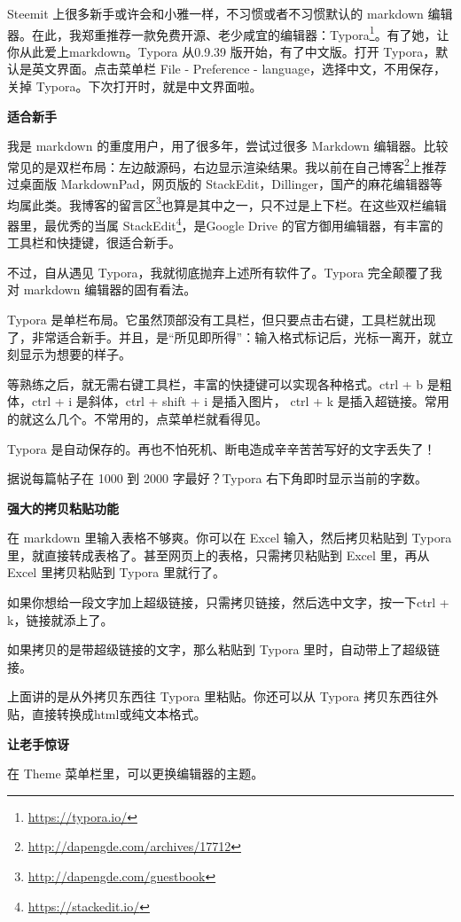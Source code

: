 \documentclass[]{ctexbook}
\renewcommand{\href}[2]{#2\footnote{\url{#1}}}
\begin{document}
Steemit 上很多新手或许会和小雅一样，不习惯或者不习惯默认的 markdown 编辑器。在此，我郑重推荐一款免费开源、老少咸宜的编辑器：\href{https://typora.io/}{Typora}。有了她，让你从此爱上markdown。Typora 从0.9.39 版开始，有了中文版。打开 Typora，默认是英文界面。点击菜单栏 File - Preference - language，选择中文，不用保存，关掉 Typora。下次打开时，就是中文界面啦。

\textbf{适合新手}

我是 markdown 的重度用户，用了很多年，尝试过很多 Markdown 编辑器。比较常见的是双栏布局：左边敲源码，右边显示渲染结果。我以前在\href{http://dapengde.com/archives/17712}{自己博客}上推荐过桌面版 MarkdownPad，网页版的 StackEdit，Dillinger，国产的麻花编辑器等均属此类。我\href{http://dapengde.com/guestbook}{博客的留言区}也算是其中之一，只不过是上下栏。在这些双栏编辑器里，最优秀的当属 \href{https://stackedit.io/}{StackEdit}，是Google Drive 的官方御用编辑器，有丰富的工具栏和快捷键，很适合新手。

不过，自从遇见 Typora，我就彻底抛弃上述所有软件了。Typora 完全颠覆了我对 markdown 编辑器的固有看法。

Typora 是单栏布局。它虽然顶部没有工具栏，但只要点击右键，工具栏就出现了，非常适合新手。并且，是``所见即所得''：输入格式标记后，光标一离开，就立刻显示为想要的样子。

等熟练之后，就无需右键工具栏，丰富的快捷键可以实现各种格式。ctrl + b 是粗体，ctrl + i 是斜体，ctrl + shift + i 是插入图片， ctrl + k 是插入超链接。常用的就这么几个。不常用的，点菜单栏就看得见。

Typora 是自动保存的。再也不怕死机、断电造成辛辛苦苦写好的文字丢失了！

据说每篇帖子在 1000 到 2000 字最好？Typora 右下角即时显示当前的字数。

\textbf{强大的拷贝粘贴功能}

在 markdown 里输入表格不够爽。你可以在 Excel 输入，然后拷贝粘贴到 Typora 里，就直接转成表格了。甚至网页上的表格，只需拷贝粘贴到 Excel 里，再从 Excel 里拷贝粘贴到 Typora 里就行了。

如果你想给一段文字加上超级链接，只需拷贝链接，然后选中文字，按一下ctrl + k，链接就添上了。

如果拷贝的是带超级链接的文字，那么粘贴到 Typora 里时，自动带上了超级链接。

上面讲的是从外拷贝东西往 Typora 里粘贴。你还可以从 Typora 拷贝东西往外贴，直接转换成html或纯文本格式。

\textbf{让老手惊讶}

在 Theme 菜单栏里，可以更换编辑器的主题。
\end{document}
